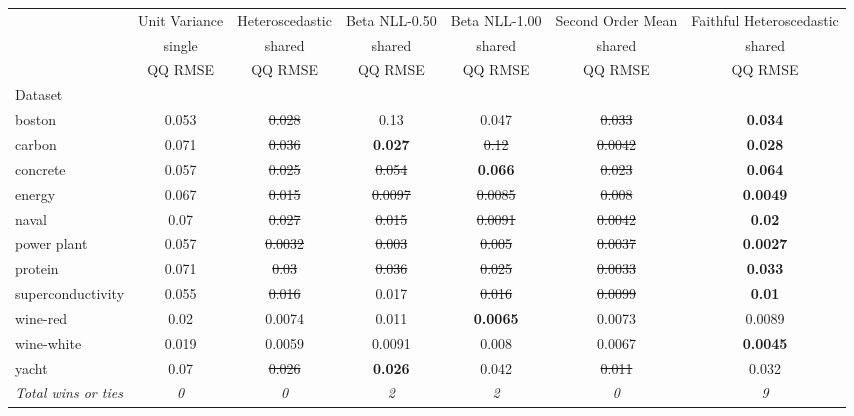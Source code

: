 \begin{tabular}{l|c|c|c|c|c|c}
\toprule
{} & {Unit Variance} & {Heteroscedastic} & {Beta NLL-0.50} & {Beta NLL-1.00} & {Second Order Mean} & {Faithful Heteroscedastic} \\
{} & {single} & {shared} & {shared} & {shared} & {shared} & {shared} \\
{} & {QQ RMSE} & {QQ RMSE} & {QQ RMSE} & {QQ RMSE} & {QQ RMSE} & {QQ RMSE} \\
{Dataset} & {} & {} & {} & {} & {} & {} \\
\midrule
boston & 0.053 & \sout{0.028} & 0.13 & 0.047 & \sout{0.033} & \textbf{0.034} \\
carbon & 0.071 & \sout{0.036} & \textbf{0.027} & \sout{0.12} & \sout{0.0042} & \textbf{0.028} \\
concrete & 0.057 & \sout{0.025} & \sout{0.054} & \textbf{0.066} & \sout{0.023} & \textbf{0.064} \\
energy & 0.067 & \sout{0.015} & \sout{0.0097} & \sout{0.0085} & \sout{0.008} & \textbf{0.0049} \\
naval & 0.07 & \sout{0.027} & \sout{0.015} & \sout{0.0091} & \sout{0.0042} & \textbf{0.02} \\
power plant & 0.057 & \sout{0.0032} & \sout{0.003} & \sout{0.005} & \sout{0.0037} & \textbf{0.0027} \\
protein & 0.071 & \sout{0.03} & \sout{0.036} & \sout{0.025} & \sout{0.0033} & \textbf{0.033} \\
superconductivity & 0.055 & \sout{0.016} & 0.017 & \sout{0.016} & \sout{0.0099} & \textbf{0.01} \\
wine-red & 0.02 & 0.0074 & 0.011 & \textbf{0.0065} & 0.0073 & 0.0089 \\
wine-white & 0.019 & 0.0059 & 0.0091 & 0.008 & 0.0067 & \textbf{0.0045} \\
yacht & 0.07 & \sout{0.026} & \textbf{0.026} & 0.042 & \sout{0.011} & 0.032 \\
\textit{{Total wins or ties}} & \textit{0} & \textit{0} & \textit{2} & \textit{2} & \textit{0} & \textit{9} \\
\bottomrule
\end{tabular}
